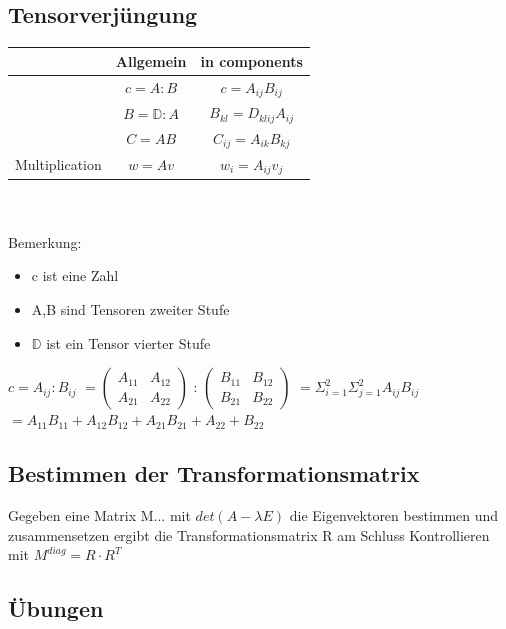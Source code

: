 \documentclass[a4paper]{scrartcl}
\begin{document}
\subsection{Tensorverjüngung}
\begin{tabular}{|c|c|c|}
\hline  & Allgemein & in components \\ 
\hline  & $c=A:B$ & $c=A_{ij}B_{ij}$ \\ 
\hline  & $B=\mathbb{D}:A$ & $B_{kl}=D_{klij}A_{ij}$ \\
\hline  & $C=AB$ & $C_{ij}=A_{ik}B_{kj}$ \\
\hline Multiplication & $w=Av$ & $w_i=A_{ij}v_{j}$ \\
\hline 
\end{tabular} 
\\
\\
Bemerkung:
\begin{itemize}
\item c ist eine Zahl
\item A,B sind Tensoren zweiter Stufe
\item $\mathbb{D}$ ist ein Tensor vierter Stufe
\end{itemize} 


$ 
c = A_{ij}:B_{ij} 
$
$
=
\begin{pmatrix}
A_{11} & A_{12} \\ 
A_{21} & A_{22}
\end{pmatrix} 
$
:
$
\begin{pmatrix}
B_{11} & B_{12} \\ 
B_{21} & B_{22}
\end{pmatrix} 
$
$
=\varSigma_{i=1}^{2}\varSigma_{j=1}^{2}A_{ij}B_{ij}
$
$
=A_{11}B_{11}+A_{12}B_{12}+A_{21}B_{21}+A_{22}+B_{22}
$


\subsection{Bestimmen der Transformationsmatrix}

Gegeben eine Matrix M... mit $det(A-\lambda E)$ die Eigenvektoren bestimmen und zusammensetzen ergibt die Transformationsmatrix R am Schluss Kontrollieren mit $M^{diag}=R \cdot R^T$



\subsection{Übungen}
\end{document}

